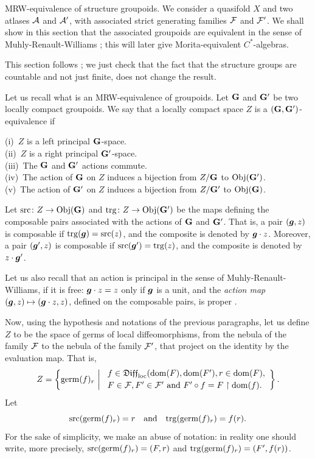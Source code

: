 \begin{Article}{MRW-equivalence of structure groupoids.}{}
  We consider a quasifold $X$ and two atlases $\mathcal{A}$ and $\mathcal{A}'$,
  with associated strict generating families $\mathcal{F}$ and $\mathcal{F}'$.
  We shall show in this section that the associated groupoids are equivalent in the sense of Muhly-Renault-Williams \cite[2.1]{MRW87};
  this will later give Morita-equivalent $C^*$-algebras.
  
  This section follows \cite[\textsection\,8]{IZL18};
  we just check that the fact that the structure groups are countable and not just finite,
  does not change the result.
  
  Let us recall what is an MRW-equivalence of groupoids.
  Let ${\mathbf G}$ and ${\mathbf G}'$ be two locally compact groupoids.
  We say that a locally compact space $Z$ is a $({\mathbf G},{\mathbf G}')$-equivalence if
  
  (i)~$Z$ is a left principal ${\mathbf G}$-space.\\
  (ii)~$Z$ is a right principal ${\mathbf G}'$-space. \\
  (iii)~The ${\mathbf G}$ and ${\mathbf G}'$ actions commute. \\
  (iv)~The action of ${\mathbf G}$ on $Z$ induces a bijection from $Z/{\mathbf G}$ to ${\operatorname{Obj}}({\mathbf G}')$. \\
  (v)~The action of ${\mathbf G}'$ on $Z$ induces a bijection from $Z/{\mathbf G}'$ to ${\operatorname{Obj}}({\mathbf G})$.
  
  Let $\mathrm{src} \colon Z \to {\operatorname{Obj}}({\mathbf G})$ and $\mathrm{trg} \colon Z \to {\operatorname{Obj}}({\mathbf G}')$ be the maps defining the composable pairs associated with the actions of ${\mathbf G}$ and ${\mathbf G}'$.
  That is,
  a pair $({\boldsymbol g},z)$ is composable if $\mathrm{trg}({\boldsymbol g})=\mathrm{src}(z)$,
  and the composite is denoted by ${\boldsymbol g} \cdot z$.
  Moreover,
  a pair $({\boldsymbol g}',z)$ is composable if $\mathrm{src}({\boldsymbol g}')=\mathrm{trg}(z)$,
  and the composite is denoted by $z \cdot {\boldsymbol g}'$.
  
  Let us also recall that an action is principal in the sense of Muhly-Renault-Williams,
  if it is free: ${\boldsymbol g} \cdot z = z$ only if ${\boldsymbol g}$ is a unit,
  and the \emph{action map} $({\boldsymbol g}, z) \mapsto ({\boldsymbol g} \cdot z, z)$,
  defined on the composable pairs,
  is proper  \cite[\textsection\,2]{MRW87}.
  
  Now,
  using the hypothesis and notations of the previous paragraphs,
  let us define $Z$ to be the space of germs of local diffeomorphisms,
  from the nebula of the family $\mathcal{F}$ to the nebula of the family $\mathcal{F}'$,
  that project on the identity by the evaluation map.
  That is,
  \[
    Z = \left\{\operatorname{germ}(f)_r \ \bigg\vert \
    \begin{array}{l}
    f \in \mathfrak{Diff}_{\mathrm{loc}}(\mathrm{dom}(F),\mathrm{dom}(F'), r \in \mathrm{dom}(F), \\ [.5ex]
    F \in \mathcal{F}, F' \in \mathcal{F}' \text{ and } F' \circ f = F \restriction \mathrm{dom}(f).
    \end{array} \right\}.
    \]
  Let
  \[
    \mathrm{src}(\operatorname{germ}(f)_r) = r \quad \text{and}\quad \mathrm{trg}(\operatorname{germ}(f)_r) = f(r).
    \]
  For the sake of simplicity,
  we make an abuse of notation:
  in reality one should write,
  more precisely,
  $\mathrm{src}(\operatorname{germ}(f)_r) = (F, r)$ and $\mathrm{trg}(\operatorname{germ}(f)_r) = (F', f(r))$.
  

\end{Article}
